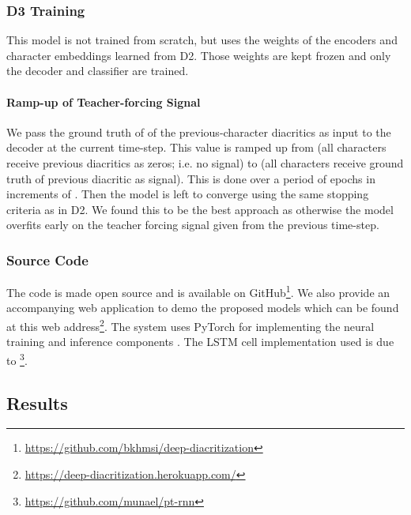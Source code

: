 \documentclass[11pt]{article}
\begin{document}
\subsubsection{D3 Training}
\label{d3-training}
This model is not trained from scratch, but uses the weights of the encoders and character embeddings learned from D2. Those weights are kept frozen and only the decoder and classifier are trained.

\paragraph{Ramp-up of Teacher-forcing Signal}
\label{exp:gt-rampup}
We pass the ground truth of  of the previous-character diacritics as input to the decoder at the current time-step. This value is ramped up from  (all characters receive previous diacritics as zeros; i.e. no signal) to  (all characters receive ground truth of previous diacritic as signal). This is done over a period of  epochs in increments of . Then the model is left to converge using the same stopping criteria as in D2. We found this to be the best approach as otherwise the model overfits early on the teacher forcing signal given from the previous time-step. 

\subsubsection{Source Code}
The code is made open source and is available on GitHub\footnote{\url{https://github.com/bkhmsi/deep-diacritization}}. We also provide an accompanying web application to demo the proposed models which can be found at this web address\footnote{\url{https://deep-diacritization.herokuapp.com/}}.
The system uses PyTorch for implementing the neural training and inference components \cite{pytorch19}.
The LSTM cell implementation used is due to \cite{pt-rnn}\footnote{\url{https://github.com/munael/pt-rnn}}.

\subsection{Results}
\end{document}

